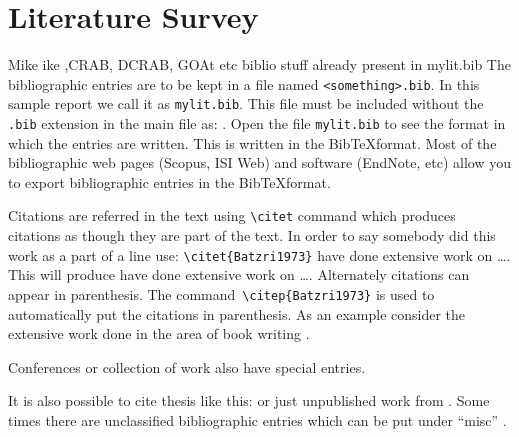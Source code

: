 \chapter{Literature Survey}
Mike ike ,CRAB, DCRAB, GOAt etc biblio stuff already present in mylit.bib
The bibliographic entries are to be kept in a file named
\verb|<something>.bib|. In this sample report we call it as
\verb|mylit.bib|. This file must be included without the \verb|.bib|
extension in the main file as: \verb||.   Open the
file \verb|mylit.bib| to see the format in which the entries are
written. This is written in the Bib\TeX format. Most of the
bibliographic web pages (Scopus, ISI Web) and software (EndNote, etc)
allow you to export bibliographic entries in the Bib\TeX format.

Citations are referred in the text using \verb|\citet| command which produces citations as though they are part of the text.  In order to say
somebody did this work as a part of a line use:
\verb|\citet{Batzri1973}| have done extensive work on \ldots.  This will produce
\citet{Batzri1973} have done extensive work on \ldots. Alternately citations can appear in parenthesis.  
The command~\verb|\citep{Batzri1973}| is used to automatically put the
citations in parenthesis.  As an example consider the extensive work
done in the area of book writing \citep{Sackmann1995a,Boal2012}.

Conferences \citep{rich-mart92} or collection of work
\citep{Sackmann1995a} also have special entries.

It is also possible to cite thesis like this:
\citet{jariwala00,luding94} or just unpublished work from
\citet{SunHI03}. Some times there are unclassified bibliographic
entries which can be put under ``misc'' \citep{Smith99}.
\citep{Whatisqubit} 
\citep{Tejas_APS1} \citep{wiki:resonator}


